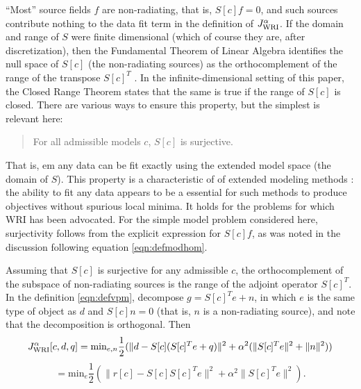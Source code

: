 ``Most'' source fields $f$ are non-radiating, that is, $S[c]f=0$, and
such sources contribute nothing to the data fit term in the definition
of $J_{\rm WRI}^{\alpha}$. If the domain and range of $S$ were finite
dimensional (which of course they are, after discretization), then the
Fundamental Theorem of Linear Algebra identifies the null space of
$S[c]$ (the non-radiating sources) as the orthocomplement of the range
of the transpose $S[c]^T$ \cite[]{Strang:93}. In the
infinite-dimensional setting of this paper, the Closed Range Theorem
\cite[]{Yosida} states that the same is true if the range of $S[c]$ is
closed. There are various ways to ensure this property, but the
simplest is relevant here:
\begin{quote}
  For all admissible models $c$, $S[c]$ is surjective.
\end{quote}
That is, {em any data can be fit exactly using the extended model
  space (the domain of $S$)}.
This property is a characteristic of of extended modeling
methods \cite[]{geoprosp:2008}: the ability to fit any data appears to
be a essential for such methods to produce objectives
without spurious local minima. It holds for the problems for which WRI
has been advocated. For the simple model problem considered
here, surjectivity follows from the explicit expression for $S[c]f$,
as was noted in the discussion following equation \ref{eqn:defmodhom}.

Assuming that $S[c]$ is surjective for any admissible $c$, the
orthocomplement of the subspace of non-radiating sources is the range
of the adjoint operator $S[c]^T$. In the
definition \ref{eqn:defvpm}, decompose $g = S[c]^Te + n$, in
which $e$ is the same type of object as $d$ and $S[c]n=0$ (that is,
$n$ is a non-radiating source), and note that the decomposition is
orthogonal. Then
\[
  J_{\rm WRI}^{\alpha}[c,d,q] =
  \mbox{min}_{e,n} \frac{1}{2}(\| d-S[c](S[c]^Te+q)\|^2+\alpha^2(\|S[c]^Te\|^2+\|n\|^2))
  \]
\begin{equation}
  \label{eqn:defvpmred}
 =  \mbox{min}_{e} \frac{1}{2}(\|r[c]-S[c]S[c]^Te\|^2+\alpha^2\|S[c]^Te\|^2).
 \end{equation}
 
